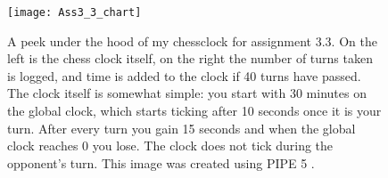 \documentclass{article}
\newcommand{\subfigimg}[3][,]{%
	\setbox1=\hbox{\texttt{[image: \#3]}}%
	\leavevmode\rlap{\usebox1}%
	\rlap{\hspace*{0.9\linewidth}\raisebox{\dimexpr\ht1-1.75\baselineskip}{#2}}%
	\phantom{\usebox1}%
}
\begin{document}
	\begin{figure}
		\centering
		\texttt{[image: Ass3\_3\_chart]}
		\caption{A peek under the hood of my chessclock for assignment 3.3. On the left is the chess clock itself, on the right the number of turns taken is logged, and time is added to the clock if 40 turns have passed. The clock itself is somewhat simple: you start with 30 minutes on the global clock, which starts ticking after 10 seconds once it is your turn. After every turn you gain 15 seconds and when the global clock reaches 0 you lose. The clock does not tick during the opponent's turn.
		 This image was created using PIPE 5 \cite{dingle2009pipe2, bonet2007pipe}. \label{fig:ass3_3_chart}}
	\end{figure}
	
	
	\newpage 
	
	

		
	
\end{document}
